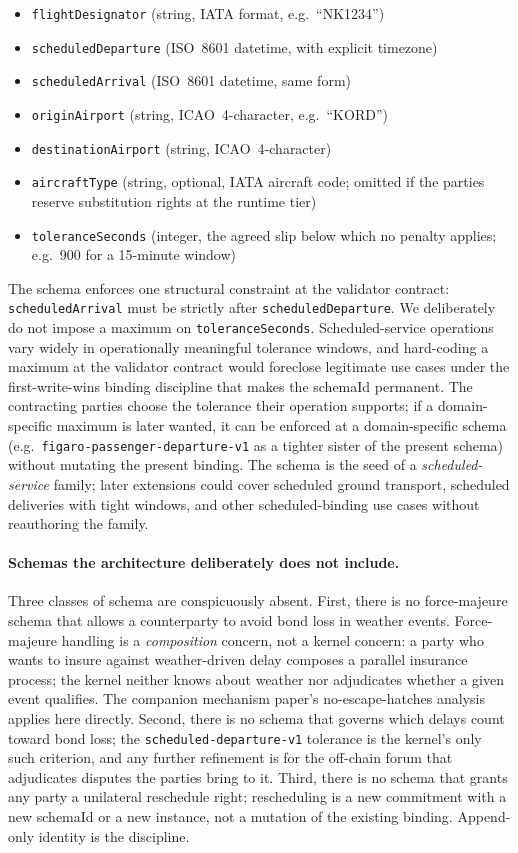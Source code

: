 \documentclass[11pt,a4paper]{article}
\theoremstyle{definition}
\theoremstyle{remark}
\begin{document}
\begin{itemize}
  \item \texttt{flightDesignator} (string, IATA format, e.g.\ ``NK1234'')
  \item \texttt{scheduledDeparture} (ISO~8601 datetime, with explicit timezone)
  \item \texttt{scheduledArrival} (ISO~8601 datetime, same form)
  \item \texttt{originAirport} (string, ICAO~4-character, e.g.\ ``KORD'')
  \item \texttt{destinationAirport} (string, ICAO~4-character)
  \item \texttt{aircraftType} (string, optional, IATA aircraft code; omitted
    if the parties reserve substitution rights at the runtime tier)
  \item \texttt{toleranceSeconds} (integer, the agreed slip below which
    no penalty applies; e.g.\ 900 for a 15-minute window)
\end{itemize}

The schema enforces one structural constraint at the validator
contract: \texttt{scheduledArrival} must be strictly after
\texttt{scheduledDeparture}. We deliberately do not impose a
maximum on \texttt{toleranceSeconds}. Scheduled-service operations
vary widely in operationally meaningful tolerance windows, and
hard-coding a maximum at the validator contract would foreclose
legitimate use cases under the first-write-wins binding discipline
that makes the schemaId permanent. The contracting parties choose
the tolerance their operation supports; if a domain-specific
maximum is later wanted, it can be enforced at a domain-specific
schema (e.g.\ \texttt{figaro-passenger-departure-v1} as a tighter
sister of the present schema) without mutating the present
binding. The schema is the seed of a \emph{scheduled-service}
family; later extensions could cover scheduled ground transport,
scheduled deliveries with tight windows, and other
scheduled-binding use cases without reauthoring the family.

\paragraph{Schemas the architecture deliberately does not include.}
Three classes of schema are conspicuously absent. First, there is
no force-majeure schema that allows a counterparty to avoid bond
loss in weather events. Force-majeure handling is a
\emph{composition} concern, not a kernel concern: a party who
wants to insure against weather-driven delay composes a parallel
insurance process; the kernel neither knows about weather nor
adjudicates whether a given event qualifies. The companion
mechanism paper's no-escape-hatches analysis applies here
directly. Second, there is no schema that governs which delays
count toward bond loss; the \texttt{scheduled-departure-v1}
tolerance is the kernel's only such criterion, and any further
refinement is for the off-chain forum that adjudicates disputes
the parties bring to it. Third, there is no schema that grants
any party a unilateral reschedule right; rescheduling is a new
commitment with a new schemaId or a new instance, not a mutation
of the existing binding. Append-only identity is the discipline.
\end{document}
